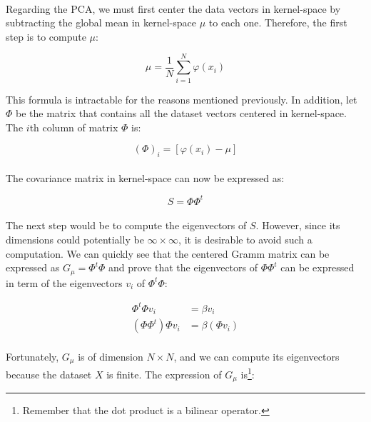 \paragraph{}
Regarding the PCA, we must first center the data vectors in kernel-space by subtracting the global mean in kernel-space $\mu$ to each one.
Therefore, the first step is to compute $\mu$:

$$\mu = \frac{1}{N}\sum_{i = 1}^{N} \varphi(x_i)$$

This formula is intractable for the reasons mentioned previously.  In addition,
let $\Phi$ be the matrix that contains all the dataset vectors centered in
kernel-space. The $i$th column of matrix $\Phi$ is:

$$(\Phi)_i = [\varphi(x_i) - \mu]$$

\paragraph{} The covariance matrix in kernel-space can now be expressed as:

$$S = \Phi\Phi^t$$

\paragraph{} The next step would be to compute the eigenvectors of $S$.
However, since its dimensions could potentially be $\infty \times \infty$, it
is desirable to avoid such a computation. We can quickly see that the centered
Gramm matrix can be expressed as $G_\mu = \Phi^t\Phi$ and prove that
the eigenvectors of $\Phi\Phi^t$ can be expressed in term of the eigenvectors
$v_i$ of $\Phi^t\Phi$:

\begin{align}\label{eq:grammcovar}
\Phi^t\Phi v_i &= \beta v_i \\
(\Phi\Phi^t)\Phi v_i &= \beta (\Phi v_i)
\end{align}

\paragraph{} Fortunately, $G_\mu$ is of dimension $N \times N$, and we can
compute its eigenvectors because the dataset $X$ is finite. The expression of
$G_\mu$ is\footnote{Remember that the dot product is a bilinear operator.}:

